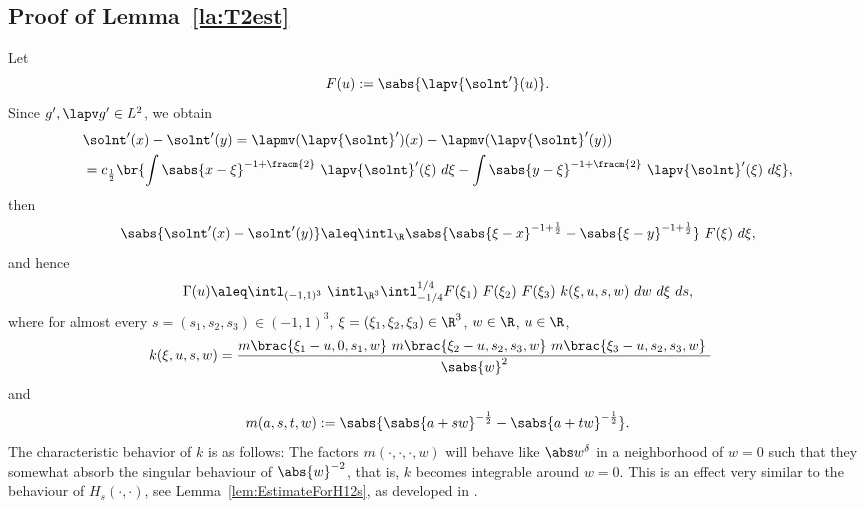 \subsection{%
Proof of Lemma~\ref{la:T2est}}
Let
\[
 F(u) := \sabs{\lapv {\solnt'}(u)}.
\]
Since $g',\lapv g'\in L^2$, we obtain
\begin{align*}
 &{\solnt}'(x)-{\solnt}'(y) = \lapmv (\lapv {\solnt}')(x)-\lapmv (\lapv {\solnt}'(y)) \\
 &= c_{\frac12}\br{\int \sabs{x-\xi}^{-1+\fracm{2}}\ \lapv {\solnt}'(\xi)\ d\xi-\int \sabs{y-\xi}^{-1+\fracm{2}}\ \lapv {\solnt}'(\xi)\ d\xi},
\end{align*}
then
\[
 \sabs{{\solnt}'(x)-{\solnt}'(y)} \aleq \intl_{\R} \sabs{\sabs{\xi-x}^{-1+\frac{1}{2}}-\sabs{\xi-y}^{-1+\frac{1}{2}}}\ {F(\xi)}\ d\xi,
\]
and hence
\[
 \Gamma(u) \aleq \intl_{(-1,1)^3}\ \intl_{\R^3} \intl_{-1/4}^{1/4} {F(\xi_1)}\ {F(\xi_2)}\ {F(\xi_3)}\ k(\xi,u,s,w)
\ dw\ d\xi\ ds, 
\]
where for almost every $s = (s_1,s_2,s_3) \in (-1,1)^3$, $\xi = (\xi_1,\xi_2,\xi_3) \in \R^3$, $w \in \R$, $u \in \R$,
\begin{align}\label{eq:k}
 k(\xi,u,s,w) 
&= \frac{
m\brac{\xi_1-u,0,s_1,w}\ 
m\brac{\xi_2-u,s_2,s_3,w}\ 
m\brac{\xi_3-u,s_2,s_3,w}\ 
} {\sabs{w}^{2}}
\end{align}
and
\[
m(a,s,t,w) := \sabs{\sabs{a+sw}^{-\frac{1}{2}}-\sabs{a+tw}^{-\frac{1}{2}}}.
\]
The characteristic behavior of $k$ is as follows:
The factors $m(\cdot,\cdot,\cdot,w)$ will behave like $\abs w^\delta$ in a neighborhood of $w=0$
such that they somewhat absorb the singular behaviour of $\abs{w}^{-2}$, that is, $k$ becomes integrable around $w=0$. This is an effect very similar to the behaviour of $H_{s}(\cdot,\cdot)$, see Lemma~\ref{lem:EstimateForH12s}, as developed in \cite{SchikorraIntBoundFrac11}.

